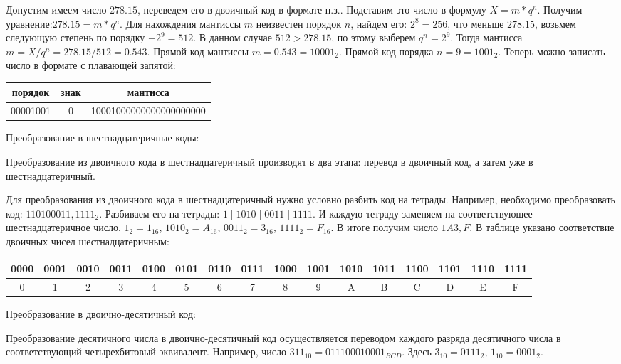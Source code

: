 \documentclass[unicode, 12pt, a4paper, oneside]{article}
\begin{document}
Допустим имеем число $278.15$, переведем его в двоичный код в формате п.з.. Подставим это число в формулу $ X=m\ast q^{n} $. Получим уравнение:$278.15= m\ast q^{n}$. Для нахождения мантиссы $m$ неизвестен порядок $n $, найдем его: $2^{8}=256$, что меньше $278.15$, возьмем следующую степень по порядку $-2^{9}=512$. В данном случае $512>278.15$, по этому выберем $q^{n}=2^{9}$. Тогда мантисса $m=X/q^{n} =278.15/512=0.543$. Прямой код мантиссы $m=0.543=10001_{2}$. Прямой код порядка $n=9=1001_{2}$. Теперь можно записать число в формате с плавающей запятой:

\begin{center}
\begin{tabular}{|c|c|c|}
\hline порядок  & знак & мантисса                \\ 
\hline 00001001 & 0    & 10001000000000000000000 \\ 
\hline 
\end{tabular}
\end{center}

Преобразование в шестнадцатеричные коды:

Преобразование из двоичного кода в шестнадцатеричный производят в два этапа: перевод в двоичный код, а затем уже в шестнадцатеричный.

Для преобразования из двоичного кода в шестнадцатеричный нужно условно разбить код на тетрады. Например, необходимо преобразовать код: $ 110100011,1111_{2} $. Разбиваем его на тетрады: $ 1 \mid 1010 \mid 0011 \mid 1111 $. И каждую тетраду заменяем на соответствующее шестнадцатеричное число. $ 1_{2} = 1_{16} $, $ 1010_{2} = A_{16} $, $ 0011_{2} = 3_{16} $, $ 1111_{2} = F_{16} $. В итоге получим число $ 1A3,F $. В таблице указано соответствие двоичных чисел шестнадцатеричным:

\begin{center}
\small
\begin{tabular}{|c|c|c|c|c|c|c|c|c|c|c|c|c|c|c|c|}
\hline 0000 & 0001 & 0010 & 0011 & 0100 & 0101 & 0110 & 0111 & 1000 & 1001 & 1010 & 1011 & 1100 & 1101 & 1110 & 1111 \\ 
\hline 0 & 1 & 2 & 3 & 4 & 5 & 6 & 7 & 8 & 9 & A & B & C & D & E & F \\ 
\hline 
\end{tabular}
\end{center}

Преобразование в двоично-десятичный код:

Преобразование десятичного числа в двоично-десятичный код осуществляется переводом каждого разряда десятичного числа в соответствующий четырехбитовый эквивалент. Например, число $ 311_{10} = 011100010001_{BCD} $. Здесь  $3_{10} = 0111_{2}$, $1_{10} = 0001_{2}$.
\end{document}

